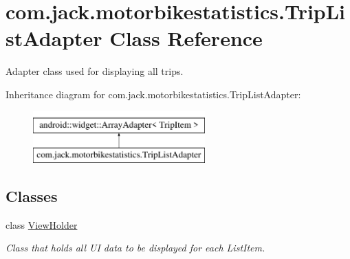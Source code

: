 \hypertarget{classcom_1_1jack_1_1motorbikestatistics_1_1_trip_list_adapter}{}\section{com.\+jack.\+motorbikestatistics.\+Trip\+List\+Adapter Class Reference}
\label{classcom_1_1jack_1_1motorbikestatistics_1_1_trip_list_adapter}


Adapter class used for displaying all trips.  


Inheritance diagram for com.\+jack.\+motorbikestatistics.\+Trip\+List\+Adapter\+:\begin{figure}[H]
\begin{center}
\leavevmode
\includegraphics[height=2.000000cm]{classcom_1_1jack_1_1motorbikestatistics_1_1_trip_list_adapter}
\end{center}
\end{figure}
\subsection*{Classes}
\begin{DoxyCompactItemize}
\item 
class \hyperlink{classcom_1_1jack_1_1motorbikestatistics_1_1_trip_list_adapter_1_1_view_holder}{View\+Holder}
\begin{DoxyCompactList}\small\item\em Class that holds all UI data to be displayed for each List\+Item. \end{DoxyCompactList}\end{DoxyCompactItemize}
